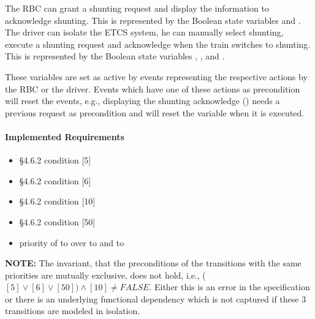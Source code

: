 \documentclass{template/openetcs_article}
\begin{document}
The RBC can grant a shunting request and display the information to acknowledge
shunting. This is represented by the Boolean state variables
 and . The driver can
isolate the ETCS system, he can manually select shunting, execute a shunting
request and acknowledge when the train switches to shunting. This is represented
by the Boolean state variables ,
,  and
.

These variables are set as active by events representing the respective actions
by the RBC or the driver. Events which have one of these actions as precondition
will reset the events, e.g., displaying the shunting acknowledge
() needs a previous request as precondition and
will reset the variable  when it is executed.

\paragraph{Implemented Requirements}
\label{sec:impl-requ-1}

\begin{itemize}
\item §4.6.2 condition [5]
\item §4.6.2 condition [6]
\item §4.6.2 condition [10]
\item §4.6.2 condition [50]
\item priority of  to  over  to  and
   to 
\end{itemize}

{\bf NOTE:} The invariant, that the preconditions of the transitions with the
same priorities are mutually exclusive, does not hold, i.e., ($[5] \vee [6] \vee
[50]) \wedge [10] \neq FALSE$. Either this is an error in the specification or
there is an underlying functional dependency which is not captured if these 3
transitions are modeled in isolation.


\end{document}
